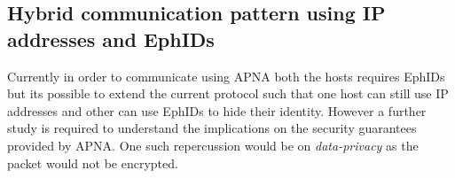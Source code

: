 \subsection{Hybrid communication pattern using IP addresses and EphIDs}
Currently in order to communicate using APNA both the hosts requires EphIDs but its possible to extend the current protocol such that one host can still use IP addresses and other can use EphIDs to hide their identity. However a further study is required to understand the implications on the security guarantees provided by APNA. One such repercussion would be on \textit{data-privacy} as the packet would not be encrypted.
